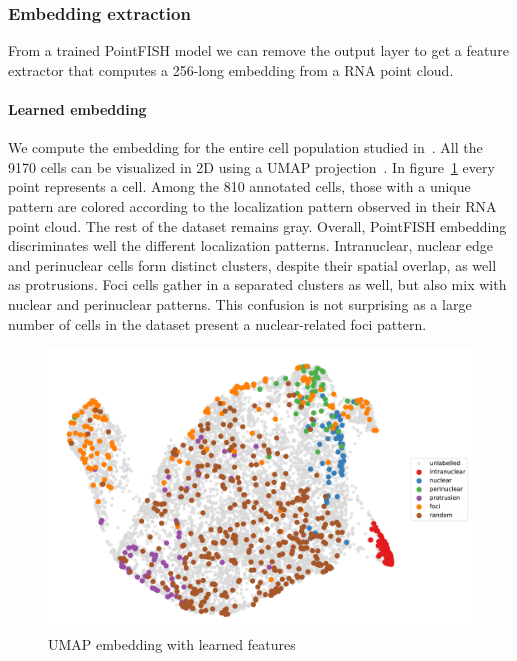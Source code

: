 \subsubsection{Embedding extraction}

From a trained PointFISH model we can remove the output layer to get a feature extractor that computes a 256-long embedding from a \ac{RNA} point cloud.

\paragraph{Learned embedding}

We compute the embedding for the entire cell population studied in~\cite{CHOUAIB_2020}.
All the 9170 cells can be visualized in 2D using a UMAP projection~\cite{McInnes2018}.
In figure~\ref{fig:umap_real} every point represents a cell.
Among the 810 annotated cells, those with a unique pattern are colored according to the localization pattern observed in their \ac{RNA} point cloud.
The rest of the dataset remains gray.
Overall, PointFISH embedding discriminates well the different localization patterns.
Intranuclear, nuclear edge and perinuclear cells form distinct clusters, despite their spatial overlap, as well as protrusions.
Foci cells gather in a separated clusters as well, but also mix with nuclear and perinuclear patterns.
This confusion is not surprising as a large number of cells in the dataset present a nuclear-related foci pattern.

\begin{figure}[h]
    \centering
    \includegraphics[width=1\textwidth]{figures/chapter4/umap_real}
    \caption{UMAP embedding with learned features}
    \label{fig:umap_real}
\end{figure}

